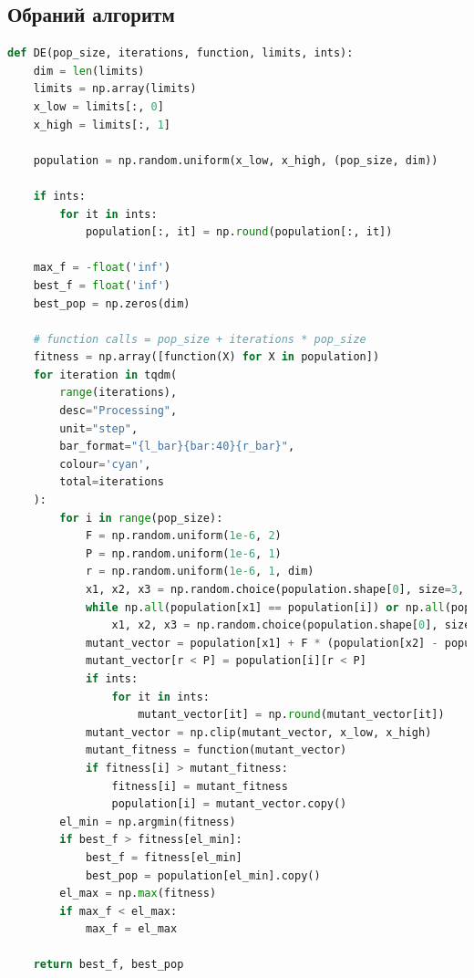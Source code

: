 \documentclass{article}
\begin{document}
        \subsection{Обраний алгоритм}
            \begin{lstlisting}[language=Python, caption=DE]
def DE(pop_size, iterations, function, limits, ints):
    dim = len(limits)
    limits = np.array(limits)
    x_low = limits[:, 0]
    x_high = limits[:, 1]

    population = np.random.uniform(x_low, x_high, (pop_size, dim))

    if ints:
        for it in ints:
            population[:, it] = np.round(population[:, it])

    max_f = -float('inf')
    best_f = float('inf')
    best_pop = np.zeros(dim)

    # function calls = pop_size + iterations * pop_size
    fitness = np.array([function(X) for X in population])
    for iteration in tqdm(
        range(iterations),
        desc="Processing",
        unit="step",
        bar_format="{l_bar}{bar:40}{r_bar}",
        colour='cyan',
        total=iterations
    ):
        for i in range(pop_size):
            F = np.random.uniform(1e-6, 2)
            P = np.random.uniform(1e-6, 1)
            r = np.random.uniform(1e-6, 1, dim)
            x1, x2, x3 = np.random.choice(population.shape[0], size=3, replace=False)
            while np.all(population[x1] == population[i]) or np.all(population[x2] == population[i]) or np.all(population[x3] == population[i]):
                x1, x2, x3 = np.random.choice(population.shape[0], size=3, replace=False)
            mutant_vector = population[x1] + F * (population[x2] - population[x3])
            mutant_vector[r < P] = population[i][r < P]
            if ints:
                for it in ints:
                    mutant_vector[it] = np.round(mutant_vector[it])
            mutant_vector = np.clip(mutant_vector, x_low, x_high)
            mutant_fitness = function(mutant_vector)
            if fitness[i] > mutant_fitness:
                fitness[i] = mutant_fitness
                population[i] = mutant_vector.copy()
        el_min = np.argmin(fitness)
        if best_f > fitness[el_min]:
            best_f = fitness[el_min]
            best_pop = population[el_min].copy()
        el_max = np.max(fitness)
        if max_f < el_max:
            max_f = el_max

    return best_f, best_pop
            \end{lstlisting}
\end{document}
